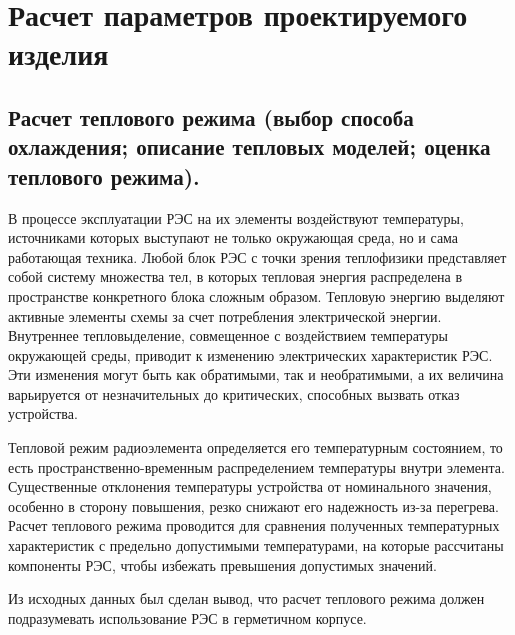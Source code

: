 \section{Расчет параметров проектируемого изделия}

\subsection{Расчет теплового режима (выбор способа охлаждения;
  описание тепловых моделей;  оценка теплового режима). }



В процессе эксплуатации РЭС на их элементы воздействуют температуры,
источниками которых выступают не только окружающая среда, но и сама
работающая техника. Любой блок РЭС с точки зрения теплофизики
представляет собой систему множества тел, в которых тепловая энергия
распределена в пространстве конкретного блока сложным
образом. Тепловую энергию выделяют активные элементы схемы за счет
потребления электрической энергии. Внутреннее тепловыделение,
совмещенное с воздействием температуры окружающей среды, приводит к
изменению электрических характеристик РЭС. Эти изменения могут быть
как обратимыми, так и необратимыми, а их величина варьируется от
незначительных до критических, способных вызвать отказ устройства.

Тепловой режим радиоэлемента определяется его температурным
состоянием, то есть пространственно-временным распределением
температуры внутри элемента. Существенные отклонения температуры
устройства от номинального значения, особенно в сторону повышения,
резко снижают его надежность из-за перегрева. Расчет теплового режима
проводится для сравнения полученных температурных характеристик с
предельно допустимыми температурами, на которые рассчитаны компоненты
РЭС, чтобы избежать превышения допустимых значений.


Из исходных данных был сделан вывод, что расчет теплового режима
должен подразумевать использование РЭС в герметичном корпусе.

